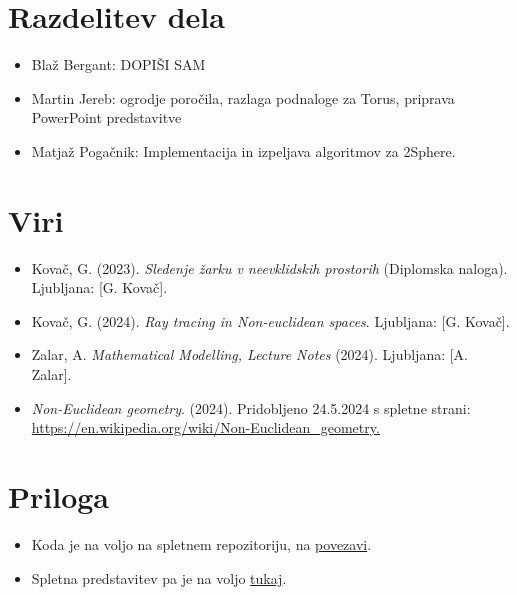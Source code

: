 \documentclass[titlepage]{article}
\begin{document}
\section{Razdelitev dela}
\begin{itemize}
  \item Blaž Bergant: DOPIŠI SAM
  \item Martin Jereb: ogrodje poročila, razlaga podnaloge za Torus, priprava PowerPoint predstavitve
\item Matjaž Pogačnik: Implementacija in izpeljava algoritmov za 2Sphere.
\end{itemize}

\section{Viri}
\begin{itemize}
  \item Kovač, G. (2023). \textit{Sledenje žarku v neevklidskih prostorih} (Diplomska naloga). Ljubljana: [G. Kovač].
  \item Kovač, G. (2024). \textit{Ray tracing in Non-euclidean spaces}. Ljubljana: [G. Kovač].
  \item Zalar, A. \textit{Mathematical Modelling, Lecture Notes} (2024). Ljubljana: [A. Zalar].
  \item \textit{Non-Euclidean geometry}. (2024). Pridobljeno 24.5.2024 s spletne strani: \url{https://en.wikipedia.org/wiki/Non-Euclidean_geometry.}
\end{itemize}

\section{Priloga}
\begin{itemize}
  \item Koda je na voljo na spletnem repozitoriju, na \href{https://github.com/MAZI2/Ray-tracing-non-euclidean-spaces}{povezavi}.
  \item Spletna predstavitev pa je na voljo \href{https://docs.google.com/presentation/d/1NP8gkPzV8rE2ToBoUAP4b7w2yMkAWgCmlsRPMn_5Ahc/edit?usp=sharing}{tukaj}.
\end{itemize}
\end{document}
